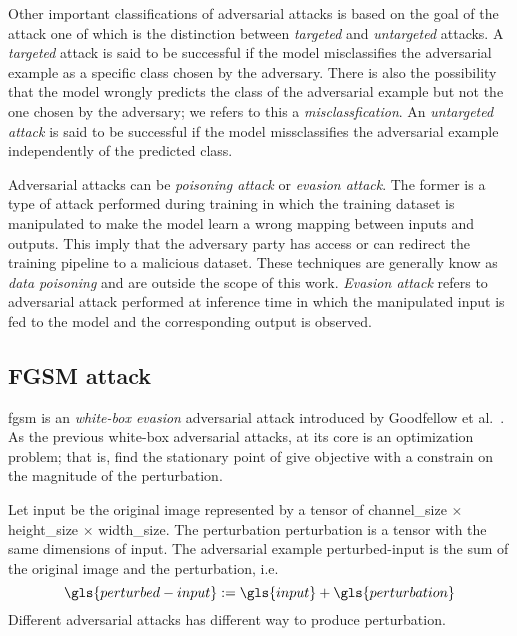 Other important classifications of adversarial attacks is based on the goal of the attack one of which is the distinction between \emph{targeted} and \emph{untargeted} attacks.
A \emph{targeted} attack is said to be successful if the model misclassifies the adversarial example as a specific class chosen by the adversary. There is also the possibility that the model wrongly predicts the class of the adversarial example but not the one chosen by the adversary; we refers to this a \emph{misclassfication}.
An \emph{untargeted attack} is said to be successful if the model missclassifies the adversarial example independently of the predicted class.

Adversarial attacks can be \emph{poisoning attack} or \emph{evasion attack}.
The former is a type of attack performed during training in which the training dataset is manipulated to make the model learn a wrong mapping between inputs and outputs. This imply that the adversary party has access or can redirect the training pipeline to a malicious dataset. These techniques are generally know as \emph{data poisoning} and are outside the scope of this work.
\emph{Evasion attack} refers to adversarial attack performed at inference time in which the manipulated input is fed to the model and the corresponding output is observed.

\subsection{FGSM attack}
\label{subsec:fgsm-attack}

\acrfull{fgsm} is an \emph{white-box evasion} adversarial attack introduced by Goodfellow et al.~\cite{ExplainingAndGoodfe2014}. As the previous white-box adversarial attacks, at its core is an optimization problem; that is, find the stationary point of give objective with a constrain on the magnitude of the perturbation.

Let \gls{input} be the original image represented by a tensor of \gls{channel_size} $\times$ \gls{height_size} $\times$ \gls{width_size}.
The perturbation \gls{perturbation} is a tensor with the same dimensions of \gls{input}. The adversarial example \gls{perturbed-input} is the sum of the original image and the perturbation, i.e.
\begin{equation}
  \gls{perturbed-input} := \gls{input} + \gls{perturbation}
  \label{eq:perturbed-input}
\end{equation}
Different adversarial attacks has different way to produce \gls{perturbation}.

